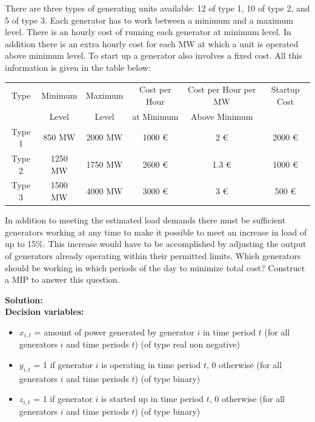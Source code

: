 \documentclass[a4paper,10pt]{article}
\begin{document}
There are three types of generating units available: 12 of type 1, 10 of type 2, and 5 of type 3.
Each generator has to work between a minimum and a maximum level. There is an hourly cost
of running each generator at minimum level. In addition there is an extra hourly cost for each
MW at which a unit is operated above minimum level. To start up a generator also involves a
fixed cost. All this information is given in the table below:

\begin{table}[H]
\centering
\begin{tabular}{|c|c|c|c|c|c|}
\hline
Type & Minimum & Maximum  & Cost per Hour & Cost per Hour per MW & Startup Cost \\
 &  Level &  Level & at Minimum & Above Minimum & \\
\hline
Type 1 & 850 MW & 2000 MW & 1000 \euro & 2 \euro & 2000 \euro \\
Type 2 & 1250 MW & 1750 MW & 2600 \euro & 1.3 \euro & 1000 \euro \\
Type 3 & 1500 MW & 4000 MW & 3000 \euro & 3 \euro & 500 \euro \\
\hline
\end{tabular}
\end{table}

In addition to meeting the estimated load demands there must be sufficient generators working
at any time to make it possible to meet an increase in load of up to 15$\%$. This increase would
have to be accomplished by adjusting the output of generators already operating within their
permitted limits.
Which generators should be working in which periods of the day to minimize total cost? Construct
a MIP to answer this question.

\textbf{Solution:}\\
\textbf{Decision variables:}
\begin{itemize}
  \item \(x_{i,t}\) = amount of power generated by generator \(i\) in time period \(t\) (for all generators \(i\) and time periods \(t\)) (of type real non negative)
  \item \(y_{i,t}\) = 1 if generator \(i\) is operating in time period \(t\), 0 otherwise (for all generators \(i\) and time periods \(t\)) (of type binary)
  \item \(z_{i,t}\) = 1 if generator \(i\) is started up in time period \(t\), 0 otherwise (for all generators \(i\) and time periods \(t\)) (of type binary)
\end{itemize}
\end{document}

